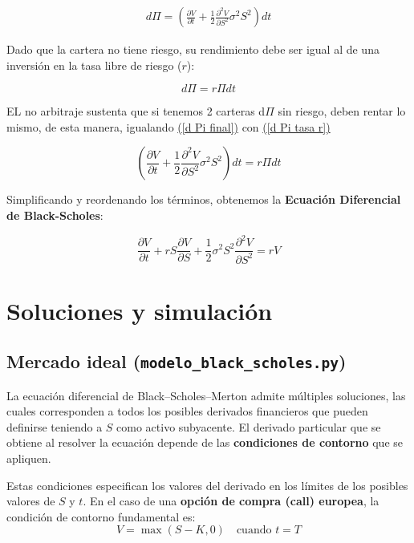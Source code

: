 \documentclass[11pt]{article}
\begin{document}
			\begin{gather}
				d\Pi = \left( \frac{\partial V}{\partial t} + \frac{1}{2} \frac{\partial^2 V}{\partial S^2} \sigma^2 S^2 \right) dt
				\label{d Pi final}
			\end{gather}
			
			Dado que la cartera no tiene riesgo, su rendimiento debe ser igual al de una inversión en la tasa libre de riesgo ($r$):
			
			\begin{equation}
				d\Pi = r \Pi dt
				\label{d Pi tasa r}
			\end{equation}
			
			EL no arbitraje sustenta que si tenemos 2 carteras d$\Pi$ sin riesgo, deben rentar lo mismo, de esta manera, igualando \hyperref[d Pi final]{(\ref{d Pi final})} con \hyperref[d Pi tasa r]{(\ref{d Pi tasa r})}
			
			\begin{equation*}
			\left( \frac{\partial V}{\partial t} + \frac{1}{2} \frac{\partial^2 V}{\partial S^2} \sigma^2 S^2 \right) dt
			=
			r \Pi dt
			\end{equation*}
			
			Simplificando y reordenando los términos, obtenemos la \textbf{Ecuación Diferencial de Black-Scholes}:
			
			\begin{equation}
			\boxed{\frac{\partial V}{\partial t} + r S \frac{\partial V}{\partial S} + \frac{1}{2} \sigma^2 S^2 \frac{\partial^2 V}{\partial S^2} = r V
			}
			\end{equation}
	
	\section{Soluciones y simulación}
		\subsection{Mercado ideal (\texttt{modelo\_black\_scholes.py})}
			La ecuación diferencial de Black--Scholes--Merton admite múltiples soluciones, las cuales corresponden a todos los posibles derivados financieros que pueden definirse teniendo a $S$ como activo subyacente. El derivado particular que se obtiene al resolver la ecuación depende de las \textbf{condiciones de contorno} que se apliquen. 
			
			Estas condiciones especifican los valores del derivado en los límites de los posibles valores de $S$ y $t$. En el caso de una \textbf{opción de compra (call) europea}, la condición de contorno fundamental es:
			\begin{equation}
				V = \max(S - K, 0) \quad \text{cuando } t = T
			\end{equation}
			
\end{document}

